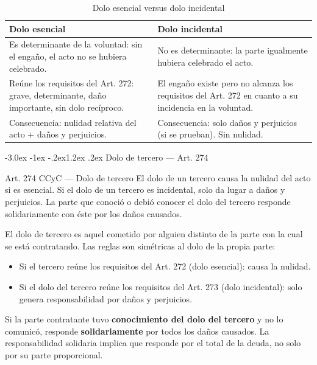 \documentclass[12pt,oneside]{book}
\makeatletter
\renewcommand\section{\@startsection{section}{1}{\z@}%
  {-3.0ex \@plus -1ex \@minus -.2ex}{1.2ex \@plus .2ex}%
  {\normalfont\large\bfseries\color{acento}}}
\makeatother
\begin{document}
\begin{table}[H]
\centering
\begin{tabularx}{\textwidth}{>{\raggedright\arraybackslash}X >{\raggedright\arraybackslash}X}
\toprule
\textbf{Dolo esencial} & \textbf{Dolo incidental} \\
\midrule
Es determinante de la voluntad: sin el engaño, el acto no se hubiera celebrado. & No es determinante: la parte igualmente hubiera celebrado el acto. \\[4pt]
Reúne los requisitos del Art. 272: grave, determinante, daño importante, sin dolo recíproco. & El engaño existe pero no alcanza los requisitos del Art. 272 en cuanto a su incidencia en la voluntad. \\[4pt]
Consecuencia: nulidad relativa del acto + daños y perjuicios. & Consecuencia: solo daños y perjuicios (si se prueban). Sin nulidad. \\
\bottomrule
\end{tabularx}
\caption{Dolo esencial versus dolo incidental}
\end{table}

\section{Dolo de tercero --- Art. 274}

\begin{articulo}{Art. 274 CCyC --- Dolo de tercero}
El dolo de un tercero causa la nulidad del acto si es esencial. Si el dolo de un tercero es incidental, solo da lugar a daños y perjuicios. La parte que conoció o debió conocer el dolo del tercero responde solidariamente con éste por los daños causados.
\end{articulo}

El dolo de tercero es aquel cometido por alguien distinto de la parte con la cual se está contratando. Las reglas son simétricas al dolo de la propia parte:

\begin{itemize}
    \item Si el tercero reúne los requisitos del Art. 272 (dolo esencial): causa la nulidad.
    \item Si el dolo del tercero reúne los requisitos del Art. 273 (dolo incidental): solo genera responsabilidad por daños y perjuicios.
\end{itemize}

Si la parte contratante tuvo \textbf{conocimiento del dolo del tercero} y no lo comunicó, responde \textbf{solidariamente} por todos los daños causados. La responsabilidad solidaria implica que responde por el total de la deuda, no solo por su parte proporcional.
\end{document}
